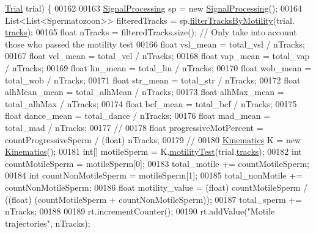 \begin{DoxyCode}
      \hyperlink{classdata_1_1_trial}{Trial} trial) \{
00162 
00163     \hyperlink{classfunctions_1_1_signal_processing}{SignalProcessing} sp = \textcolor{keyword}{new} \hyperlink{classfunctions_1_1_signal_processing}{SignalProcessing}();
00164     List<List<Spermatozoon>> filteredTracks = sp.\hyperlink{classfunctions_1_1_signal_processing_a7302e4cf91bc23463aa9354325d2993d}{filterTracksByMotility}(trial.
      \hyperlink{classdata_1_1_trial_ab0c3156759c41236f7f0bc83e1e5ef8f}{tracks});
00165     \textcolor{keywordtype}{float} nTracks = filteredTracks.size(); \textcolor{comment}{// Only take into account those who passed the motility test}
00166     \textcolor{keywordtype}{float} vsl\_mean = total\_vsl / nTracks;
00167     \textcolor{keywordtype}{float} vcl\_mean = total\_vcl / nTracks;
00168     \textcolor{keywordtype}{float} vap\_mean = total\_vap / nTracks;
00169     \textcolor{keywordtype}{float} lin\_mean = total\_lin / nTracks;
00170     \textcolor{keywordtype}{float} wob\_mean = total\_wob / nTracks;
00171     \textcolor{keywordtype}{float} str\_mean = total\_str / nTracks;
00172     \textcolor{keywordtype}{float} alhMean\_mean = total\_alhMean / nTracks;
00173     \textcolor{keywordtype}{float} alhMax\_mean = total\_alhMax / nTracks;
00174     \textcolor{keywordtype}{float} bcf\_mean = total\_bcf / nTracks;
00175     \textcolor{keywordtype}{float} dance\_mean = total\_dance / nTracks;
00176     \textcolor{keywordtype}{float} mad\_mean = total\_mad / nTracks;
00177     \textcolor{comment}{// %
00178     \textcolor{keywordtype}{float} progressiveMotPercent = countProgressiveSperm / (float) nTracks;
00179     \textcolor{comment}{// %
00180     \hyperlink{classfunctions_1_1_kinematics}{Kinematics} K = \textcolor{keyword}{new} \hyperlink{classfunctions_1_1_kinematics}{Kinematics}();
00181     \textcolor{keywordtype}{int}[] motileSperm = K.\hyperlink{classfunctions_1_1_kinematics_a5dbef047c19d4c554b08ba879eb7443f}{motilityTest}(trial.\hyperlink{classdata_1_1_trial_ab0c3156759c41236f7f0bc83e1e5ef8f}{tracks});
00182     \textcolor{keywordtype}{int} countMotileSperm = motileSperm[0];
00183     total\_motile += countMotileSperm;
00184     \textcolor{keywordtype}{int} countNonMotileSperm = motileSperm[1];
00185     total\_nonMotile += countNonMotileSperm;
00186     \textcolor{keywordtype}{float} motility\_value = (float) countMotileSperm / ((\textcolor{keywordtype}{float}) (countMotileSperm + countNonMotileSperm));
00187     total\_sperm += nTracks;
00188 
00189     rt.incrementCounter();
00190     rt.addValue(\textcolor{stringliteral}{"Motile trajectories"}, nTracks);
}}
\end{DoxyCode}
